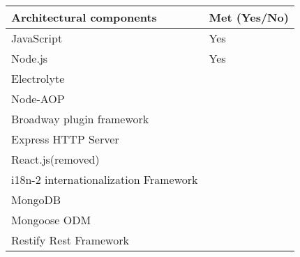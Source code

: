 \begin{tabular}{|l|l|}
	\hline
	Architectural components & Met (Yes/No)\\
	\hline
	JavaScript & Yes \\
	Node.js & Yes\\	 
	Electrolyte & \\
	Node-AOP & \\
	Broadway plugin framework & \\
	Express HTTP Server & \\
	React.js(removed) & \\
	i18n-2 internationalization Framework & \\
	MongoDB & \\
	Mongoose ODM & \\
	Restify Rest Framework & \\
	
	\hline
\end{tabular}